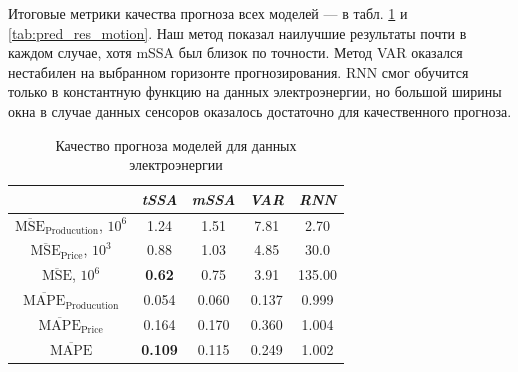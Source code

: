 			Итоговые метрики качества прогноза всех моделей --- в табл. \ref{tab:pred_res_electr} и \ref{tab:pred_res_motion}. Наш метод показал наилучшие результаты почти в каждом случае, хотя mSSA был близок по точности. Метод VAR оказался нестабилен на выбранном горизонте прогнозирования. RNN смог обучится только в константную функцию на данных электроэнергии, но большой ширины окна в случае данных сенсоров оказалось достаточно для качественного прогноза.

			\def\arraystretch{1.1}
			\begin{table}[h]
				\centering
				\caption{Качество прогноза моделей для данных электроэнергии}\label{tab:pred_res_electr}
				\begin{tabular}{|c|c|c|c|c|}
					\hline
					& \textit{tSSA}  & \textit{mSSA} & \textit{VAR} & \textit{RNN} \\ \hline
					$ \overline{\text{MSE}}_{\text{Producution}} $, $10^6$ & 1.24           & 1.51          & 7.81         & 2.70         \\ \hline
					$ \overline{\text{MSE}}_{\text{Price}} $, $10^3$      & 0.88           & 1.03          & 4.85         & 30.0         \\ \hline
					$ \overline{\text{MSE}} $, $10^6$             & \textbf{0.62}  & 0.75          & 3.91         & 135.00       \\ \hline
					$ \overline{\text{MAPE}}_{\text{Producution}} $        & 0.054          & 0.060         & 0.137        & 0.999        \\ \hline
					$ \overline{\text{MAPE}}_{\text{Price}} $             & 0.164          & 0.170         & 0.360        & 1.004        \\ \hline
					$ \overline{\text{MAPE}} $                    & \textbf{0.109} & 0.115         & 0.249        & 1.002        \\ \hline
				\end{tabular}
			\end{table}
			
